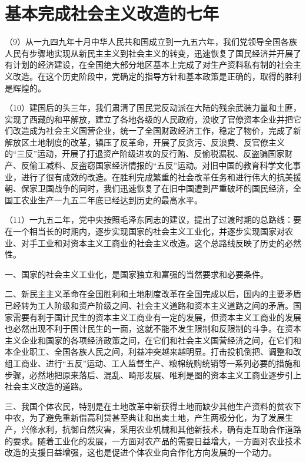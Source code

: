 \section{基本完成社会主义改造的七年}

（9）从一九四九年十月中华人民共和国成立到一九五六年，我们党领导全国各族人民有步骤地实现从新民主主义到社会主义的转变，迅速恢复了国民经济并开展了有计划的经济建设，在全国绝大部分地区基本上完成了对生产资料私有制的社会主义改造。在这个历史阶段中，党确定的指导方针和基本政策是正确的，取得的胜利是辉煌的。

（10）建国后的头三年，我们肃清了国民党反动派在大陆的残余武装力量和土匪，实现了西藏的和平解放，建立了各地各级的人民政府，没收了官僚资本企业并把它们改造成为社会主义国营企业，统一了全国财政经济工作，稳定了物价，完成了新解放区土地制度的改革，镇压了反革命，开展了反贪污、反浪费、反官僚主义的“三反”运动，开展了打退资产阶级进攻的反行贿、反偷税漏税、反盗骗国家财产、反偷工减料、反盗窃国家经济情报的“五反”运动。对旧中国的教育科学文化事业，进行了很有成效的改造。在胜利完成繁重的社会改革任务和进行伟大的抗美援朝、保家卫国战争的同时，我们迅速恢复了在旧中国遭到严重破坏的国民经济，全国工农业生产一九五二年底已经达到历史的最高水平。

（11）一九五二年，党中央按照毛泽东同志的建议，提出了过渡时期的总路线：要在一个相当长的时期内，逐步实现国家的社会主义工业化，并逐步实现国家对农业、对手工业和对资本主义工商业的社会主义改造。这个总路线反映了历史的必然性。

一、国家的社会主义工业化，是国家独立和富强的当然要求和必要条件。

二、新民主主义革命在全国胜利和土地制度改革在全国完成以后，国内的主要矛盾已经转为工人阶级和资产阶级之间、社会主义道路和资本主义道路之间的矛盾。国家需要有利于国计民生的资本主义工商业有一定的发展，但资本主义工商业的发展也必然出现不利于国计民生的一面，这就不能不发生限制和反限制的斗争。在资本主义企业和国家的各项经济政策之间，在它们和社会主义国营经济之间，在它们和本企业职工、全国各族人民之间，利益冲突越来越明显。打击投机倒把、调整和改组工商业、进行“五反”运动、工人监督生产、粮棉统购统销等一系列必要的措施和步骤，必然地把原来落后、混乱、畸形发展、唯利是图的资本主义工商业逐步引上社会主义改造的道路。

三、我国个体农民，特别是在土地改革中新获得土地而缺少其他生产资料的贫农下中农，为了避免重新借高利贷甚至典让和出卖土地，产生两极分化，为了发展生产，兴修水利，抗御自然灾害，采用农业机械和其他新技术，确有走互助合作道路的要求。随着工业化的发展，一方面对农产品的需要日益增大，一方面对农业技术改造的支援日益增强，这也是促进个体农业向合作化方向发展的一个动力。

